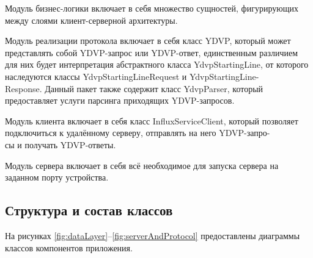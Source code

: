 Модуль бизнес-логики включает в себя множество сущностей, фигурирующих между слоями клиент-серверной архитектуры.

Модуль реализации протокола включает в себя класс YDVP, который может представлять собой YDVP-запрос или YDVP-ответ, единственным различием для них будет интерпретация абстрактного класса YdvpStartingLine, от которого наследуются классы YdvpStartingLineRequest и YdvpStartingLine-\\Response. Данный пакет также содержит класс YdvpParser, который предоставляет услуги парсинга приходящих YDVP-запросов.

Модуль клиента включает в себя класс InfluxServiceClient, который позволяет подключиться к удалённому серверу, отправлять на него YDVP-запро-\\сы и получать YDVP-ответы. 

Модуль сервера включает в себя всё необходимое для запуска сервера на заданном порту устройства.

\subsection{Структура и состав классов}
На рисунках \ref{fig:dataLayer}--\ref{fig:serverAndProtocol} предоставлены диаграммы классов компонентов приложения.

